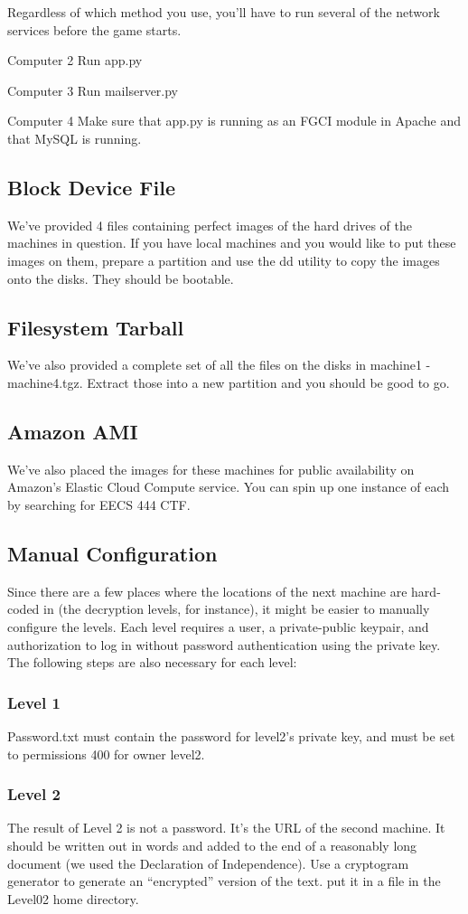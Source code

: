\documentclass[12pt]{article}
\begin{document}
Regardless of which method you use, you'll have to run several of the network
services before the game starts.
\begin{description}
\item{Computer 2}
Run app.py
\item{Computer 3}
Run mailserver.py
\item{Computer 4}
Make sure that app.py is running as an FGCI module in Apache and that MySQL is
running. 
\subsection{Block Device File}
We've provided 4 files containing perfect images of the hard drives of the machines in question.  If you have local machines and you would like to put these images on them, prepare a partition and use the dd utility to copy the images onto the disks.  They should be bootable.
\subsection{Filesystem Tarball}
We've also provided a complete set of all the files on the disks in machine1 - machine4.tgz.  Extract those into a new partition and you should be good to go.
\subsection{Amazon AMI}
We've also placed the images for these machines for public availability on Amazon's Elastic Cloud Compute service.  You can spin up one instance of each by searching for EECS 444 CTF.
\subsection{Manual Configuration}
Since there are a few places where the locations of the next machine are hard-coded in (the decryption levels, for instance), it might be easier to manually configure the levels.  Each level requires a user, a private-public keypair, and authorization to log in without password authentication using the private key.  The following steps are also necessary for each level:
\subsubsection{Level 1}
Password.txt must contain the password for level2's private key, and must be set to permissions 400 for owner level2.
\subsubsection{Level 2}
The result of Level 2 is not a password. It's the URL of the second machine. It
should be written out in words and added to the end of a reasonably long
document (we used the Declaration of Independence). Use a cryptogram generator
to generate an ``encrypted'' version of the text. put it in a file in the
Level02 home directory.

\end{description}
\end{document}
